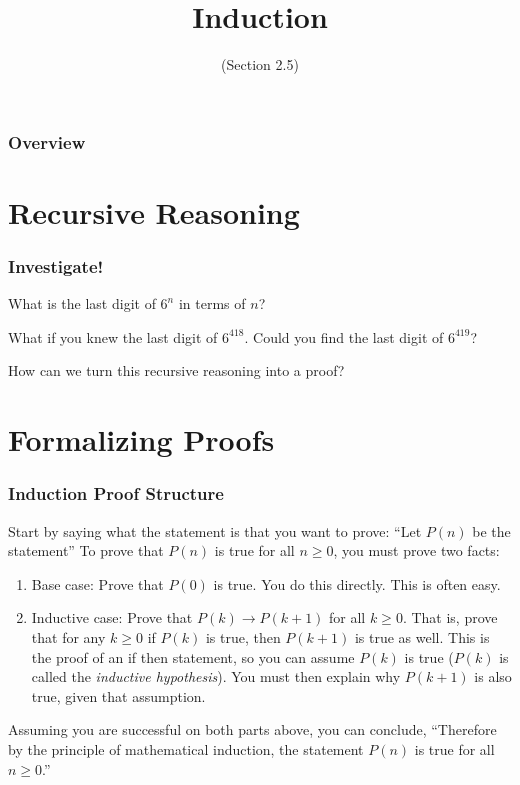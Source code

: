 \documentclass[11pt, compress]{beamer}
\title{Induction}
\subtitle{(Section 2.5)}
\author{}
\date[]{}
\newcommand{\imp}{\rightarrow}
\begin{document}
\begin{frame}
\maketitle 
\end{frame}
 
\begin{frame}
\frametitle{Overview}
\tableofcontents 
\end{frame}
 

\section{Recursive Reasoning}
\begin{frame}
\frametitle{Investigate!}
 What is the last digit of \(6^n\) in terms of \(n\)?
 
\pause \vfill 

What if you knew the last digit of \(6^{418}\).  Could you find the last digit of \(6^{419}\)?
 
\pause \vfill 

How can we turn this recursive reasoning into a proof?
\end{frame}
 


\section{Formalizing Proofs}
\begin{frame}
\frametitle{Induction Proof Structure}
 Start by saying what the statement is that you want to prove: ``Let \(P(n)\) be the statement\textellipsis{}'' To prove that \(P(n)\) is true for all \(n \ge 0\), you must prove two facts:\begin{enumerate}
\item{} Base case: Prove that \(P(0)\) is true. You do this directly. This is often easy.


\item{} Inductive case: Prove that \(P(k) \imp P(k+1)\) for all \(k \ge 0\). That is, prove that for any \(k \ge 0\) if \(P(k)\) is true, then \(P(k+1)\) is true as well. This is the proof of an if \textellipsis{} then \textellipsis{} statement, so you can assume \(P(k)\) is true (\(P(k)\) is called the \emph{inductive hypothesis}).  You must then explain why \(P(k+1)\) is also true, given that assumption.

\end{enumerate}

 Assuming you are successful on both parts above, you can conclude, ``Therefore by the principle of mathematical induction, the statement \(P(n)\) is true for all \(n \ge 0\).''
\end{frame}
 
\end{document}
